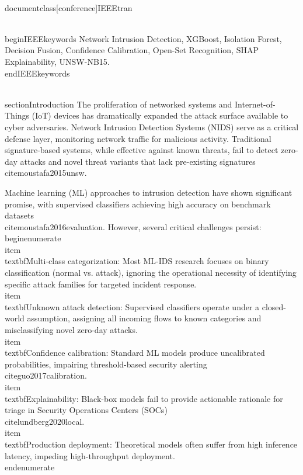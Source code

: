 \\documentclass[conference]{IEEEtran}
\begin{document}
\\begin{IEEEkeywords}
Network Intrusion Detection, XGBoost, Isolation Forest, Decision Fusion, Confidence Calibration, Open-Set Recognition, SHAP Explainability, UNSW-NB15.
\\end{IEEEkeywords}

\\section{Introduction}
The proliferation of networked systems and Internet-of-Things (IoT) devices has dramatically expanded the attack surface available to cyber adversaries. Network Intrusion Detection Systems (NIDS) serve as a critical defense layer, monitoring network traffic for malicious activity. Traditional signature-based systems, while effective against known threats, fail to detect zero-day attacks and novel threat variants that lack pre-existing signatures \\cite{moustafa2015unsw}.

Machine learning (ML) approaches to intrusion detection have shown significant promise, with supervised classifiers achieving high accuracy on benchmark datasets \\cite{moustafa2016evaluation}. However, several critical challenges persist:
\\begin{enumerate}
    \\item \\textbf{Multi-class categorization}: Most ML-IDS research focuses on binary classification (normal vs. attack), ignoring the operational necessity of identifying specific attack families for targeted incident response.
    \\item \\textbf{Unknown attack detection}: Supervised classifiers operate under a closed-world assumption, assigning all incoming flows to known categories and misclassifying novel zero-day attacks.
    \\item \\textbf{Confidence calibration}: Standard ML models produce uncalibrated probabilities, impairing threshold-based security alerting \\cite{guo2017calibration}.
    \\item \\textbf{Explainability}: Black-box models fail to provide actionable rationale for triage in Security Operations Centers (SOCs) \\cite{lundberg2020local}.
    \\item \\textbf{Production deployment}: Theoretical models often suffer from high inference latency, impeding high-throughput deployment.
\\end{enumerate}
\end{document}
